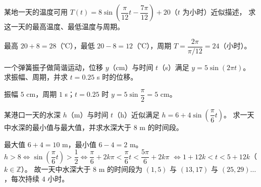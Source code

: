 \begin{problem}
某地一天的温度可用 $T(t)=8\sin\left(\dfrac{\pi}{12}t-\dfrac{7\pi}{12}\right)+20$（$t$ 为小时）近似描述，
求这一天的最高温度、最低温度与周期。
\end{problem}
\begin{solution}
最高 $20+8=28$（℃），最低 $20-8=12$（℃），周期 $T=\dfrac{2\pi}{\pi/12}=24$（小时）。
\end{solution}

\begin{problem}
一个弹簧振子做简谐运动，位移 $y$（cm）与时间 $t$（s）满足 $y=5\sin(2\pi t)$。
求振幅、周期，并求 $t=0.25$ s 时的位移。
\end{problem}
\begin{solution}
振幅 $5$ cm，周期 $1$ s；$t=0.25$ 时 $y=5\sin\dfrac{\pi}{2}=5$ cm。
\end{solution}

\begin{problem}
某港口一天的水深 $h$（m）与时间 $t$（h）近似满足 $h=6+4\sin\left(\dfrac{\pi}{6}t\right)$。
求一天中水深的最小值与最大值，并求水深大于 $8$ m 的时间段。
\end{problem}
\begin{solution}
最大值 $6+4=10$ m，最小值 $6-4=2$ m。
$h>8\iff\sin\left(\dfrac{\pi}{6}t\right)>\dfrac12
\iff\dfrac{\pi}{6}+2k\pi<\dfrac{\pi}{6}t<\dfrac{5\pi}{6}+2k\pi$
$\iff1+12k<t<5+12k$（$k\in\mathbb{Z}$）。
故一天中水深大于 $8$ m 的时间段为 $(1,5)$ 与 $(13,17)$ 与 $(25,29)\dots$，每次持续 $4$ 小时。
\end{solution}
